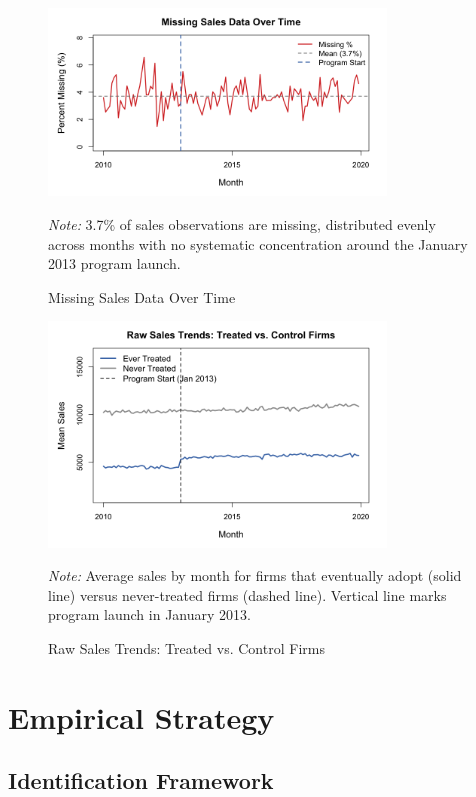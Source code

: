 \documentclass{article}
\newcommand{\note}[1]{%
  \vspace{-0.5em}
  \caption*{\small \textit{Note:} #1}
}
\begin{document}
\begin{figure}[htbp]
\centering
\includegraphics[width=0.8\textwidth]{missingness_pattern.png}
\caption{Missing Sales Data Over Time}
\label{fig:missingness}
\note{3.7\% of sales observations are missing, distributed evenly across months with no systematic concentration around the January 2013 program launch.}
\end{figure}

\begin{figure}[htbp]
\centering
\includegraphics[width=0.8\textwidth]{raw_trends.png}
\caption{Raw Sales Trends: Treated vs. Control Firms}
\label{fig:raw_trends}
\note{Average sales by month for firms that eventually adopt (solid line) versus never-treated firms (dashed line). Vertical line marks program launch in January 2013.}
\end{figure}

\section{Empirical Strategy}
\label{sec:strategy}

\subsection{Identification Framework}
\end{document}

